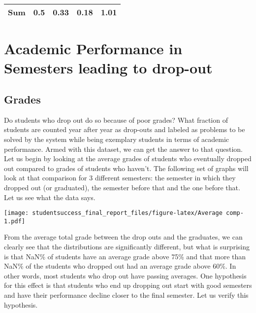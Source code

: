 \documentclass[]{book}
\theoremstyle{definition}
\theoremstyle{definition}
\theoremstyle{remark}
\begin{document}
\begin{longtable}[]{@{}ccccc@{}}
\begin{minipage}[t]{0.12\columnwidth}
\textbf{Sum}\strut
\end{minipage} & \begin{minipage}[t]{0.06\columnwidth}\centering\strut
0.5\strut
\end{minipage} & \begin{minipage}[t]{0.06\columnwidth}\centering\strut
0.33\strut
\end{minipage} & \begin{minipage}[t]{0.06\columnwidth}\centering\strut
0.18\strut
\end{minipage} & \begin{minipage}[t]{0.06\columnwidth}\centering\strut
1.01\strut
\end{minipage}\tabularnewline
\bottomrule
\end{longtable}

\section{Academic Performance in Semesters leading to
drop-out}\label{academic-performance-in-semesters-leading-to-drop-out}

\subsection{Grades}\label{grades}

Do students who drop out do so because of poor grades? What fraction of
students are counted year after year as drop-outs and labeled as
problems to be solved by the system while being exemplary students in
terms of academic performance. Armed with this dataset, we can get the
answer to that question. Let us begin by looking at the average grades
of students who eventually dropped out compared to grades of students
who haven't. The following set of graphs will look at that comparison
for 3 different semesters: the semester in which they dropped out (or
graduated), the semester before that and the one before that. Let us see
what the data says.

\texttt{[image: studentsuccess\_final\_report\_files/figure-latex/Average comp-1.pdf]}

From the average total grade between the drop outs and the graduates, we
can clearly see that the distributions are significantly different, but
what is surprising is that NaN\% of students have an average grade above
75\% and that more than NaN\% of the students who dropped out had an
average grade above 60\%. In other words, most students who drop out
have passing averages. One hypothesis for this effect is that students
who end up dropping out start with good semesters and have their
performance decline closer to the final semester. Let us verify this
hypothesis.
\end{document}
